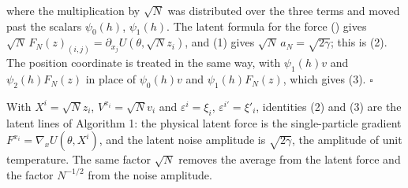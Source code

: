 \documentclass[11pt,a4paper]{article}
\begin{document}
where the multiplication by \(\sqrt N\) was distributed over the three terms and moved past the scalars \(\psi_0(h)\), \(\psi_1(h)\). The latent formula for the force (\cite[Section~3.1.4]{LangevinLean2026KIPLMC}) gives \(\sqrt N\,F_N(z)_{(i,j)}=\partial_{x_j}U(\theta,\sqrt Nz_i)\), and (1) gives \(\sqrt N\,a_N=\sqrt{2\gamma}\); this is (2). The position coordinate is treated in the same way, with \(\psi_1(h)v\) and \(\psi_2(h)F_N(z)\) in place of \(\psi_0(h)v\) and \(\psi_1(h)F_N(z)\), which gives (3). \(\square\)




With \(X^i=\sqrt Nz_i\), \(V^{x_i}=\sqrt Nv_i\) and \(\varepsilon^i=\xi_i\), \(\varepsilon^{i\prime}=\xi'_i\), identities (2) and (3) are the latent lines of Algorithm 1: the physical latent force is the single-particle gradient \(F^{x_i}=\nabla_xU(\theta,X^i)\), and the latent noise amplitude is \(\sqrt{2\gamma}\), the amplitude of unit temperature. The same factor \(\sqrt N\) removes the average from the latent force and the factor \(N^{-1/2}\) from the noise amplitude.
\end{document}
